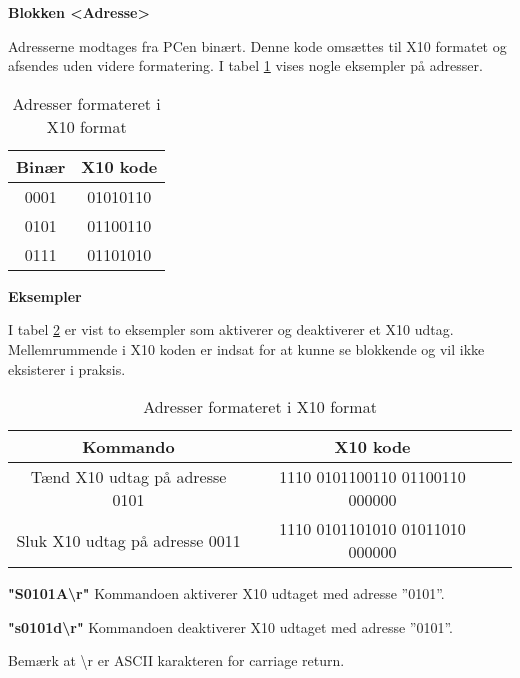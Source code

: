 \textbf{Blokken <Adresse>}

Adresserne modtages fra PCen binært. Denne kode omsættes til X10 formatet og afsendes uden videre formatering.
I tabel \ref{tabel:X10Adresser} vises nogle eksempler på adresser.

\begin{table}[h]
\caption{Adresser formateret i X10 format}
\centering
\begin{tabular}{|c|c|}
\hline 
\textbf{Binær} & \textbf{X10 kode} \\ 
\hline 
0001 & 01010110 \\ 
\hline 
0101 & 01100110 \\ 
\hline
0111 & 01101010 \\
\hline
\end{tabular}
\label{tabel:X10Adresser}
\end{table} 

\textbf{Eksempler}

I tabel \ref{tabel:X10Eksempler} er vist to eksempler som aktiverer og deaktiverer et X10 udtag. Mellemrummende i X10 koden er indsat for at kunne se blokkende og vil ikke eksisterer i praksis.

\begin{table}[h]
\caption{Adresser formateret i X10 format}
\centering
\begin{tabular}{|c|c|c|}
\hline 
\textbf{Kommando} & \textbf{X10 kode} \\ 
\hline 
Tænd X10 udtag på adresse 0101 & 1110 0101100110 01100110 000000 \\ 
\hline 
Sluk X10 udtag på adresse 0011 & 1110 0101101010 01011010 000000 \\ 
\hline
\end{tabular}
\label{tabel:X10Eksempler}
\end{table} 
\textbf{"S0101A\textbackslash r"}
Kommandoen aktiverer X10 udtaget med adresse ''0101''.

\textbf{"s0101d\textbackslash r"}
Kommandoen deaktiverer X10 udtaget med adresse ''0101''.

Bemærk at \textbackslash r er ASCII karakteren for carriage return.

